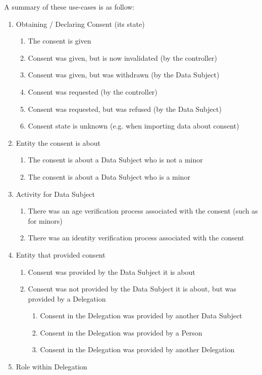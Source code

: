 A summary of these use-cases is as follow:
\begin{enumerate}
\item
  Obtaining / Declaring Consent (its state)

  \begin{enumerate}
  \item
    The consent is given
  \item
    Consent was given, but is now invalidated (by the controller)
  \item
    Consent was given, but was withdrawn (by the Data Subject)
  \item
    Consent was requested (by the controller)
  \item
    Consent was requested, but was refused (by the Data Subject)
  \item
    Consent state is unknown (e.g. when importing data about consent)
  \end{enumerate}
\item
  Entity the consent is about

  \begin{enumerate}
  \item
    The consent is about a Data Subject who is not a minor
  \item
    The consent is about a Data Subject who is a minor
  \end{enumerate}
\item
  Activity for Data Subject

  \begin{enumerate}
  \item
    There was an age verification process associated with the consent
    (such as for minors)
  \item
    There was an identity verification process associated with the
    consent
  \end{enumerate}
\item
  Entity that provided consent

  \begin{enumerate}
  \item
    Consent was provided by the Data Subject it is about
  \item
    Consent was not provided by the Data Subject it is about, but was
    provided by a Delegation

    \begin{enumerate}
    \item
      Consent in the Delegation was provided by another Data Subject
    \item
      Consent in the Delegation was provided by a Person
    \item
      Consent in the Delegation was provided by another Delegation
    \end{enumerate}
  \end{enumerate}
\item
  Role within Delegation


\end{enumerate}
